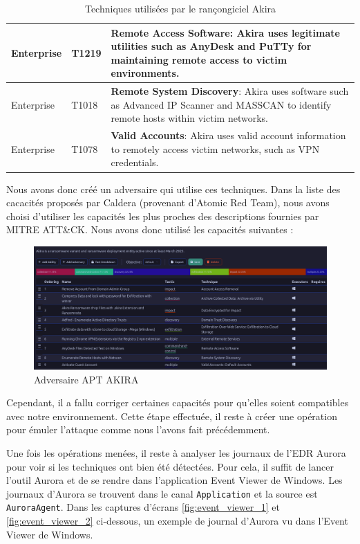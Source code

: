\documentclass[12pt,letterpaper]{article}
\begin{document}
\begin{table}[h!]
\begin{tabular}{|l|l|p{10cm}|}
        Enterprise & T1219 & \textbf{Remote Access Software}: Akira uses legitimate utilities such as AnyDesk and PuTTy for maintaining remote access to victim environments. \\ \hline
        Enterprise & T1018 & \textbf{Remote System Discovery}: Akira uses software such as Advanced IP Scanner and MASSCAN to identify remote hosts within victim networks. \\ \hline
        Enterprise & T1078 & \textbf{Valid Accounts}: Akira uses valid account information to remotely access victim networks, such as VPN credentials. \\ \hline
    \end{tabular}
    \caption{Techniques utilisées par le rançongiciel Akira}
    \label{tab:akira_techniques}
\end{table}

Nous avons donc créé un adversaire qui utilise ces techniques.
Dans la liste des cacacités proposés par Caldera (provenant d'Atomic Red Team), nous avons choisi d'utiliser les capacités les plus proches des descriptions fournies par MITRE ATT\&CK.
Nous avons donc utilisé les capacités suivantes :

\begin{figure}[h!]
    \centering
    \includegraphics[width=1\textwidth]{images/caldera/akira_adversary.png}
    \caption{Adversaire APT AKIRA}
    \label{fig:akira_adversary}
\end{figure}

Cependant, il a fallu corriger certaines capacités pour qu'elles soient compatibles avec notre environnement. 
Cette étape effectuée, il reste à créer une opération pour émuler l'attaque comme nous l'avons fait précédemment.

\bigskip

Une fois les opérations menées, il reste à analyser les journaux de l'EDR Aurora pour voir si les techniques ont bien été détectées.
Pour cela, il suffit de lancer l'outil Aurora et de se rendre dans l'application Event Viewer de Windows.
Les journaux d'Aurora se trouvent dans le canal \verb|Application| et la source est \verb|AuroraAgent|.
Dans les captures d'écrans \ref{fig:event_viewer_1} et \ref{fig:event_viewer_2} ci-dessous, un exemple de journal d'Aurora vu dans l'Event Viewer de Windows.
\end{document}
